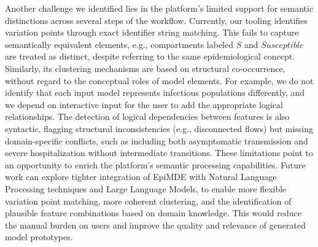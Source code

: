 Another challenge we identified lies in the platform’s limited support for semantic distinctions across several steps of the workflow.
Currently, our tooling identifies variation points through exact identifier string matching. This  fails to capture semantically equivalent elements, e.g., compartments labeled $S$ and $Susceptible$ are treated as distinct, despite referring to the same epidemiological concept.
Similarly, its clustering mechanisms are based on structural co-occurrence, without regard to the conceptual roles of model elements. 
For example, we do not identify that each input model represents infectious populations differently, and we depend on interactive input for the user to add the appropriate logical relationships.
The detection of logical dependencies between features is also syntactic, flagging structural inconsistencies (e.g., disconnected flows) but missing domain-specific conflicts, such as including both asymptomatic transmission and severe hospitalization without intermediate transitions.
These limitations point to an opportunity to enrich the platform’s semantic processing capabilities.
Future work can explore tighter integration of EpiMDE with Natural Language Processing techniques and Large Language Models, to enable more flexible variation point matching, more coherent clustering, and the identification of plausible feature combinations based on domain knowledge.
This would reduce the manual burden on users and improve the quality and relevance of generated model prototypes.



